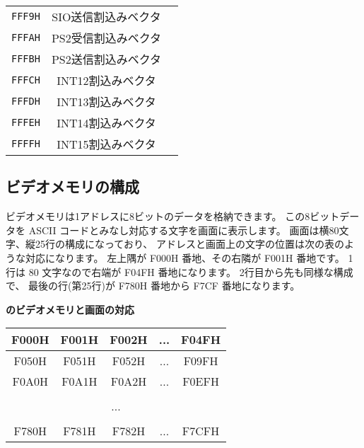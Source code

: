 \begin{center}
\begin{tabular}{|c|c|c|c|}
\cline{1-3}
{\tt FFF9H} & \multicolumn{2}{|c|}{SIO送信割込みベクタ}&      \\
\cline{1-3}
{\tt FFFAH} & \multicolumn{2}{|c|}{PS2受信割込みベクタ}&      \\
\cline{1-3}
{\tt FFFBH} & \multicolumn{2}{|c|}{PS2送信割込みベクタ}&      \\
\cline{1-3}
{\tt FFFCH} & \multicolumn{2}{|c|}{INT12割込みベクタ}  &      \\
\cline{1-3}
{\tt FFFDH} & \multicolumn{2}{|c|}{INT13割込みベクタ}  &      \\
\cline{1-3}
{\tt FFFEH} & \multicolumn{2}{|c|}{INT14割込みベクタ}  &      \\
\cline{1-3}
{\tt FFFFH} & \multicolumn{2}{|c|}{INT15割込みベクタ}  &      \\
\hline
\end{tabular}
\end{center}

\subsection{ビデオメモリの構成}

ビデオメモリは1アドレスに8ビットのデータを格納できます。
この8ビットデータを ASCII コードとみなし対応する文字を画面に表示します。
画面は横80文字、縦25行の構成になっており、
アドレスと画面上の文字の位置は次の表のような対応になります。
左上隅が F000H 番地、その右隣が F001H 番地です。
1行は 80 文字なので右端が F04FH 番地になります。
2行目から先も同様な構成で、
最後の行(第25行)が F780H 番地から F7CF 番地になります。

\begin{center}
{\bf \tac のビデオメモリと画面の対応} \\
\begin{tabular}{|c|c|c|c|c|}
\hline
F000H & F001H & F002H & ... & F04FH \\
\hline
F050H & F051H & F052H & ... & F09FH \\
\hline
F0A0H & F0A1H & F0A2H & ... & F0EFH \\
\hline
      &       &       &     &       \\
\multicolumn{5}{|c|}{...}           \\
      &       &       &     &       \\
\hline
F780H & F781H & F782H & ... & F7CFH \\
\hline
\end{tabular}
\end{center}

